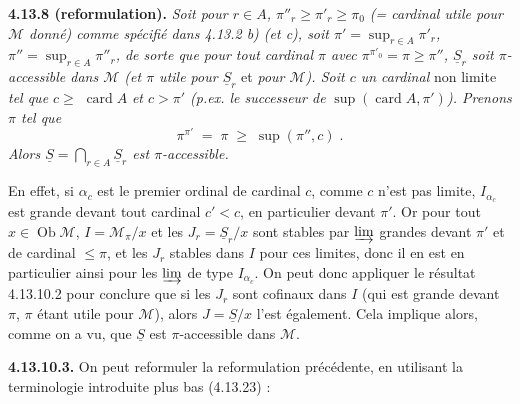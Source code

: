 \documentclass[11pt]{article}
\newcommand{\msp}[1]{\marginpar{\footnotesize [#1]}}
\newcommand{\card}{\operatorname{card}}
\newcommand{\Ob}{\operatorname{Ob}}
\begin{document}
\textbf{4.13.8 (reformulation).} \textit{Soit pour $r\in A$, $\pi''_r\geqslant\pi'_r\geqslant\pi_0$ (= cardinal utile pour $\mathcal{M}$ donné) comme spécifié dans 4.13.2 b) (et c), soit $\pi'=\sup_{r\in A}\pi'_r$, $\pi''=\sup_{r\in A}\pi''_r$, de sorte que pour tout cardinal $\pi$ avec $\pi^{\pi'_0}=\pi\geqslant\pi''$, $\underline{S}_r$ soit $\pi$-accessible dans $\mathcal{M}$ (et $\pi$ utile pour $\underline{S}_r$} et \textit{pour $\mathcal{M}$). Soit $c$ un cardinal} non limite \textit{tel que $c\geqslant$} $\card A$ \textit{et $c>\pi'$ (p.ex. le successeur de} $\sup(\card A,\pi')$\textit{). Prenons $\pi$ tel que}
\[ \pi^{\pi'} \; = \; \pi \; \geqslant \; \sup(\pi'',c) \; . \]
\textit{Alors $\underline{S}=\bigcap_{r\in A}\underline{S}_r$ est $\pi$-accessible.}

En effet, si $\alpha_c$ est le premier ordinal de cardinal $c$, comme $c$ n'est pas limite, $I_{\alpha_c}$ est grande devant tout cardinal $c'<c$, en particulier devant $\pi'$. Or pour tout $x\in\Ob\mathcal{M}$, $I=\mathcal{M}_\pi/x$ et les $J_r=\underline{S}_r/x$ sont stables par $\varinjlim$ grandes devant $\pi'$ et de cardinal $\leqslant\pi$,
\msp{page 302 bis}
et les $J_r$ stables dans $I$ pour ces limites, donc il en est en particulier ainsi pour les $\varinjlim$ de type $I_{\alpha_c}$. On peut donc appliquer le résultat 4.13.10.2 pour conclure que si les $J_r$ sont cofinaux dans $I$ (qui est grande devant $\pi$, $\pi$ étant utile pour $\mathcal{M}$), alors $J=\underline{S}/x$ l'est également. Cela implique alors, comme on a vu, que $\underline{S}$ est $\pi$-accessible dans $\mathcal{M}$.

\textbf{4.13.10.3.} On peut reformuler la reformulation précédente, en utilisant la terminologie introduite plus bas (4.13.23) :
\end{document}
